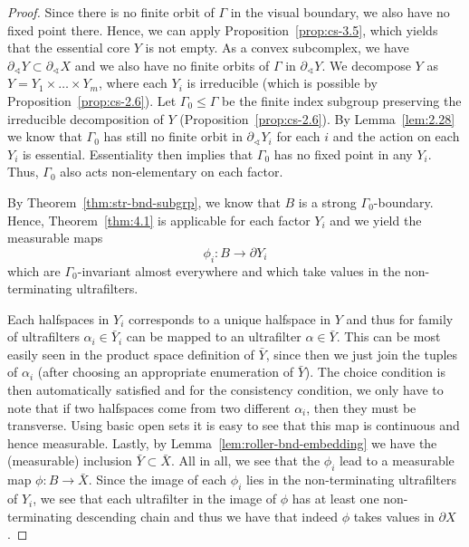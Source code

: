 \begin{proof}
  Since there is no finite orbit of \(\Gamma\) in the visual boundary, we also have no fixed point there. Hence, we can apply Proposition~\ref{prop:cs-3.5}, which yields that the essential core \(Y\) is not empty. As a convex subcomplex, we have \(\partial_\sphericalangle Y \subset \partial_\sphericalangle X\) and we also have no finite orbits of \(\Gamma\) in \(\partial_\sphericalangle Y\). We decompose \(Y\) as \(Y = Y_1 \times \dots \times Y_m\), where each \(Y_i\) is irreducible (which is possible by Proposition~\ref{prop:cs-2.6}). Let \(\Gamma_0 \leq \Gamma\) be the finite index subgroup preserving the irreducible decomposition of \(Y\) (Proposition~\ref{prop:cs-2.6}). By Lemma~\ref{lem:2.28} we know that \(\Gamma_0\) has still no finite orbit in \(\partial_\sphericalangle Y_i\) for each \(i\) and the action on each \(Y_i\) is essential. Essentiality then implies that \(\Gamma_0\) has no fixed point in any \(Y_i\). Thus, \(\Gamma_0\) also acts non-elementary on each factor.

  By Theorem~\ref{thm:str-bnd-subgrp}, we know that \(B\) is a strong \(\Gamma_0\)-boundary. Hence, Theorem~\ref{thm:4.1} is applicable for each factor \(Y_i\) and we yield the measurable maps
  \[
    \phi_i \colon B \to \partial Y_i
  \]
  which are \(\Gamma_0\)-invariant almost everywhere and which take values in the non-terminating ultrafilters. 

  Each halfspaces in \(Y_i\) corresponds to a unique halfspace in \(Y\) and thus for family of ultrafilters \(\alpha_i \in \bar Y_i\) can be mapped to an ultrafilter \(\alpha \in \bar Y\). This can be most easily seen in the product space definition of \(\bar Y\), since then we just join the tuples of \(\alpha_i\) (after choosing an appropriate enumeration of \(\bar Y\)). The choice condition is then automatically satisfied and for the consistency condition, we only have to note that if two halfspaces come from two different \(\alpha_i\), then they must be transverse. Using basic open sets it is easy to see that this map is continuous and hence measurable. Lastly, by Lemma~\ref{lem:roller-bnd-embedding} we have the (measurable) inclusion \(\bar Y \subset \bar X\). All in all, we see that the \(\phi_i\) lead to a measurable map \(\phi\colon B \to \bar X\). Since the image of each \(\phi_i\) lies in the non-terminating ultrafilters of \(Y_i\), we see that each ultrafilter in the image of \(\phi\) has at least one non-terminating descending chain and thus we have that indeed \(\phi\) takes values in \(\partial X\).
\end{proof}

